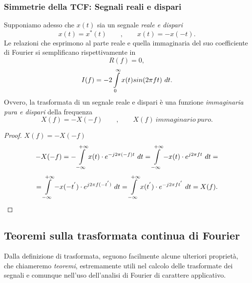 \documentclass[12pt,oneside,openany]{memoir}
\numberwithin{equation}{subsection}
\newcommand{\dt}{\ dt}
\begin{document}
\subsubsection{Simmetrie della TCF: Segnali reali e dispari}
Supponiamo adesso che $x(t)$ sia un segnale \textit{reale e dispari}
\[
	x(t) = x^*(t) \quad\quad , \quad\quad x(t) = -x(-t).
\]
Le relazioni che esprimono al parte reale e quella immaginaria del suo
coefficiente di Fourier si semplificano rispettivamente in
\[
	R(f) = 0,
\]
\[
	I(f) = -2 \int\displaylimits_{0}^{\infty} x(t) sin(2 \pi f t) \dt.
\]
Ovvero, la trasformata di un segnale reale e dispari \`e una funzione
\textit{immaginaria pura e dispari} della frequenza
\[
	X(f) = -X(-f) \quad\quad , \quad\quad X(f) \ immaginario \ puro.
\]
\begin{proof}
$X(f) = -X(-f)$
\[
	-X(-f) = -\int\displaylimits_{-\infty}^{+\infty} x(t) \cdot e^{-j 2 \pi (-f) t} \dt = \int\displaylimits_{-\infty}^{+\infty} -x(t) \cdot e^{j 2 \pi f t} \dt =
\]
\[
	= \int\displaylimits_{-\infty}^{+\infty} -x(-t^{'}) \cdot e^{j 2 \pi f (-t^{'})} \dt = \int\displaylimits_{-\infty}^{+\infty} x(t^{'}) \cdot e^{-j 2 \pi f t^{'}} \dt = X(f).
\]
\end{proof}


\newpage
\subsection{Teoremi sulla trasformata continua di Fourier}
Dalla definizione di trasformata, seguono facilmente alcune ulteriori
propriet\`a, che chiameremo \textit{teoremi}, estremamente utili nel calcolo
delle trasformate dei segnali e comunque nell'uso dell'analisi di Fourier di
carattere applicativo.

\end{document}
